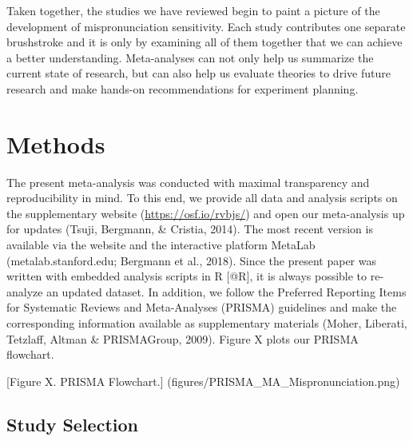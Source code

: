 \documentclass[man]{apa6}
\theoremstyle{definition}
\theoremstyle{definition}
\theoremstyle{definition}
\theoremstyle{remark}
\begin{document}
Taken together, the studies we have reviewed begin to paint a picture of
the development of mispronunciation sensitivity. Each study contributes
one separate brushstroke and it is only by examining all of them
together that we can achieve a better understanding. Meta-analyses can
not only help us summarize the current state of research, but can also
help us evaluate theories to drive future research and make hands-on
recommendations for experiment planning.

\section{Methods}\label{methods}

The present meta-analysis was conducted with maximal transparency and
reproducibility in mind. To this end, we provide all data and analysis
scripts on the supplementary website (\url{https://osf.io/rvbjs/}) and
open our meta-analysis up for updates (Tsuji, Bergmann, \& Cristia,
2014). The most recent version is available via the website and the
interactive platform MetaLab (metalab.stanford.edu; Bergmann et al.,
2018). Since the present paper was written with embedded analysis
scripts in R {[}@R{]}, it is always possible to re-analyze an updated
dataset. In addition, we follow the Preferred Reporting Items for
Systematic Reviews and Meta-Analyses (PRISMA) guidelines and make the
corresponding information available as supplementary materials (Moher,
Liberati, Tetzlaff, Altman \& PRISMAGroup, 2009). Figure X plots our
PRISMA flowchart.

{[}Figure X. PRISMA Flowchart.{]}
(figures/PRISMA\_MA\_Mispronunciation.png)

\subsection{Study Selection}\label{study-selection}
\end{document}
